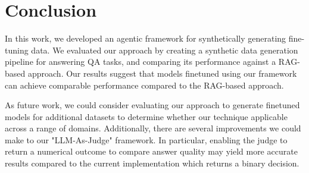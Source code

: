 \section{Conclusion}

In this work, we developed an agentic framework for synthetically generating
fine-tuning data. We evaluated our approach by creating a synthetic data
generation pipeline for answering QA tasks, and comparing its performance
against a RAG-based approach. Our results suggest that models finetuned using
our framework can achieve comparable performance compared to the RAG-based
approach.

As future work, we could consider evaluating our approach to generate finetuned
models for additional datasets to determine whether our technique applicable
across a range of domains. Additionally, there are several improvements we could
make to our "LLM-As-Judge" framework. In particular, enabling the judge to
return a numerical outcome to compare answer quality may yield more accurate
results compared to the current implementation which returns a binary decision.

